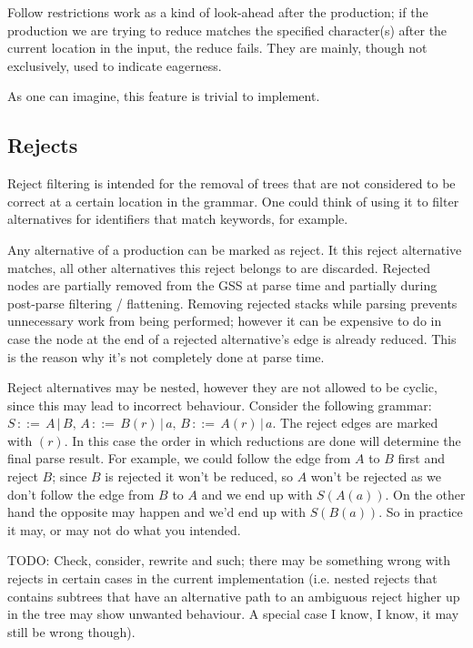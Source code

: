 \documentclass[a4paper,10pt]{article}
\begin{document}
Follow restrictions work as a kind of look-ahead after the production; if the production we are trying to reduce matches the specified character(s) after the current location in the input, the reduce fails. They are mainly, though not exclusively, used to indicate eagerness.

As one can imagine, this feature is trivial to implement.

\subsection{Rejects}

Reject filtering is intended for the removal of trees that are not considered to be correct at a certain location in the grammar. One could think of using it to filter alternatives for identifiers that match keywords, for example.

Any alternative of a production can be marked as reject. It this reject alternative matches, all other alternatives this reject belongs to are discarded. Rejected nodes are partially removed from the GSS at parse time and partially during post-parse filtering / flattening. Removing rejected stacks while parsing prevents unnecessary work from being performed; however it can be expensive to do in case the node at the end of a rejected alternative's edge is already reduced. This is the reason why it's not completely done at parse time.

Reject alternatives may be nested, however they are not allowed to be cyclic, since this may lead to incorrect behaviour. Consider the following grammar: $S\,::=\,A\,|\,B,\,A\,::=\,B(r)\,|\,a,\,B\,::=\,A(r)\,|\,a$. The reject edges are marked with $(r)$. In this case the order in which reductions are done will determine the final parse result. For example, we could follow the edge from $A$ to $B$ first and reject $B$; since $B$ is rejected it won't be reduced, so $A$ won't be rejected as we don't follow the edge from $B$ to $A$ and we end up with $S(A(a))$. On the other hand the opposite may happen and we'd end up with $S(B(a))$. So in practice it may, or may not do what you intended.

TODO: Check, consider, rewrite and such; there may be something wrong with rejects in certain cases in the current implementation (i.e. nested rejects that contains subtrees that have an alternative path to an ambiguous reject higher up in the tree may show unwanted behaviour. A special case I know, I know, it may still be wrong though).
\end{document}
